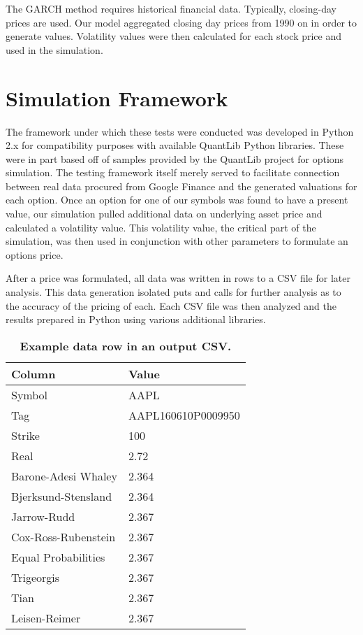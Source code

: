 The GARCH method requires historical financial data. Typically, closing-day prices are used. Our model aggregated closing day prices from 1990 on in order to generate values. Volatility values were then calculated for each stock price and used in the simulation.

\section{Simulation Framework}

The framework under which these tests were conducted was developed in Python 2.x for compatibility purposes with available QuantLib Python libraries. These were in part based off of samples provided by the QuantLib project for options simulation. The testing framework itself merely served to facilitate connection between real data procured from Google Finance and the generated valuations for each option. Once an option for one of our symbols was found to have a present value, our simulation pulled additional data on underlying asset price and calculated a volatility value. This volatility value, the critical part of the simulation, was then used in conjunction with other parameters to formulate an options price. 

After a price was formulated, all data was written in rows to a CSV file for later analysis. This data generation isolated puts and calls for further analysis as to the accuracy of the pricing of each. Each CSV file was then analyzed and the results prepared in Python using various additional libraries.

\begin{table}[h!]
\centering
\begin{tabu} to .8\textwidth { | X[c] | X[c] |  }
 \hline
 Column & Value \\
 \hline
 Symbol & AAPL \\
 Tag & AAPL160610P0009950  \\
Strike & 100 \\
Real & 2.72 \\
Barone-Adesi Whaley & 2.364 \\
Bjerksund-Stensland & 2.364 \\
Jarrow-Rudd & 2.367 \\
Cox-Ross-Rubenstein & 2.367 \\
Equal Probabilities & 2.367 \\
Trigeorgis & 2.367 \\
Tian & 2.367 \\
Leisen-Reimer & 2.367 \\
\hline
\end{tabu}
\caption {\textbf{Example data row in an output CSV.}}
\end{table}

